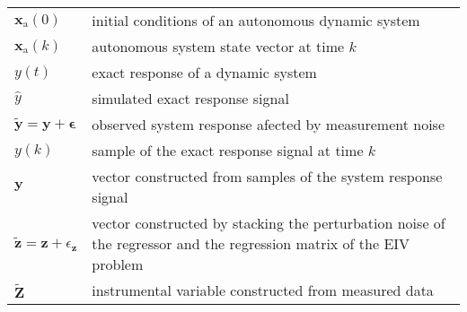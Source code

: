 \begin{longtable}[c]{>{\raggedleft}p{}>{\raggedright}p{}}
$\mathbf{x}_\text{a}(0)$  &  initial conditions of an autonomous dynamic system  \tabularnewline
$\mathbf{x}_\text{a}(k)$  &   autonomous system state vector at time $k$ \tabularnewline
$y(t)$  &  exact response of a dynamic system\tabularnewline
$\widehat{y}$  &   simulated exact response signal \tabularnewline
$\widetilde{\mathbf{y}} = \mathbf{y} + \bm{\epsilon}$  &  observed system response afected by measurement noise  \tabularnewline
$y(k)$  &  sample of the exact response signal at time $k$\tabularnewline
$\mathbf{y}$  &  vector constructed from samples of the system response signal   \tabularnewline
$\widetilde{\mathbf{z}} = \mathbf{z} + \epsilon_{\mathbf{z}}$   &  vector constructed by stacking the perturbation noise of the regressor and the regression matrix of the EIV problem \tabularnewline
$\widetilde{\mathbf{Z}}$  &  instrumental variable constructed from measured data  \tabularnewline
\end{longtable}
\color{black}
